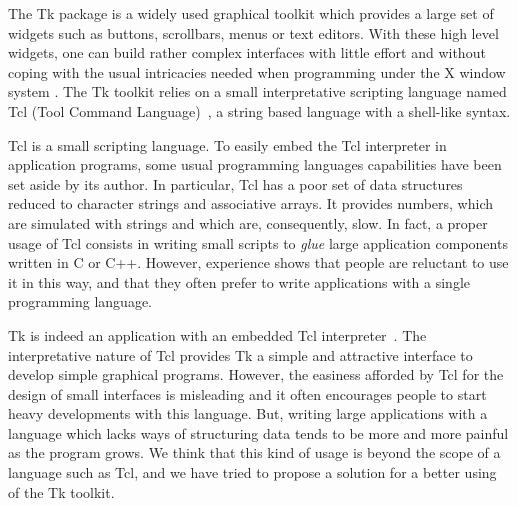 The Tk package \cite{Ouster-book} is a widely used graphical toolkit which
provides a large set of widgets such as buttons, scrollbars, menus or text
editors. With these high level widgets, one can build rather complex
interfaces with little effort and without coping with the usual intricacies
needed when programming under the X window system {\cite{X11}}. The Tk
toolkit relies on a small interpretative scripting language named Tcl (Tool
Command Language)~\cite{Ouster-Tcl}, a string based language with a
shell-like syntax.

Tcl is a small scripting language. To easily embed the Tcl interpreter
in application programs, some usual programming languages capabilities
have been set aside by its author. In particular, Tcl has a poor set
of data structures reduced to character strings and associative
arrays. It provides numbers, which are simulated with strings and
which are, consequently, slow. In fact, a proper usage of Tcl consists
in writing small scripts to {\em glue} large application components
written in C or C++. However, experience shows that people are
reluctant to use it in this way, and that they often prefer to write
applications with a single programming language.

Tk is indeed an application with an embedded Tcl
interpreter~\cite{Ouster-Tk}. The interpretative nature of Tcl
provides Tk a simple and attractive interface to develop simple
graphical programs. However, the easiness afforded by Tcl for the
design of small interfaces is misleading and it often encourages
people to start heavy developments with this language. But, writing
large applications with a language which lacks ways of structuring
data tends to be more and more painful as the program grows. We think
that this kind of usage is beyond the scope of a language such as Tcl,
and we have tried to propose a solution for a better using of the 
Tk toolkit. 

